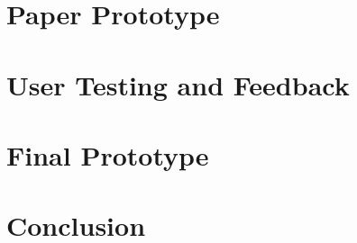 \documentclass[runningheads]{llncs}
\begin{document}
\section{Paper Prototype} \label{sec:PAPER_PROTOTYPE}

\section{User Testing and Feedback} \label{sec:USER_TESTING}

\section{Final Prototype} \label{sec:FINAL_PROTOTYPE}





\section{Conclusion} \label{sec:CONCLUSION}



\end{document}

